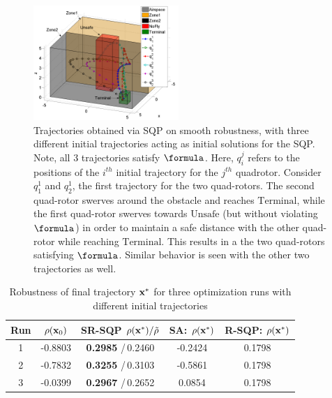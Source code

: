 

\begin{figure}[t]
\centering
\includegraphics[width=0.49\textwidth]{figures/QuadTrajs_scissored}
\caption{Trajectories obtained via SQP on smooth robustness, with three different initial trajectories acting as initial solutions for the SQP. Note, all 3 trajectories satisfy $\formula$. Here, $q_{i}^j$ refers to the positions of the $i^{th}$ initial trajectory for the $j^{th}$ quadrotor. Consider $q_{1}^1$ and $q_{2}^1$, the first trajectory for the two quad-rotors. The second quad-rotor swerves around the obstacle and reaches $\text{Terminal}$, while the first quad-rotor swerves towards $\text{Unsafe}$ (but without violating $\formula$) in order to maintain a safe distance with the other quad-rotor while reaching $\text{Terminal}$. This results in a the two quad-rotors satisfying $\formula$. Similar behavior is seen with the other two trajectories as well.}
\label{fig:quad_ssqp}
\end{figure}


%
{\small
\begin{table}[htb]
\begin{center}
\caption{Robustness of final trajectory $\mathbf{x}^*$ for three optimization runs with different initial trajectories}
\label{tbl:opt_performance}
\begin{tabular} {|c|c|c|c|c|}
	\hline
	\textbf{Run} & $\rho(\mathbf{x}_0) $ &SR-SQP $\rho(\mathbf{x}^*) /\tilde{\rho}$ & SA: $\rho(\mathbf{x}^*)$ & R-SQP: $\rho(\mathbf{x}^*)$\\ \hline
	1 & -0.8803 & \textbf{0.2985} /\,0.2460 & -0.2424 & 0.1798 \\ \hline
	2 & -0.7832 & \textbf{0.3255} /\,0.3103 & -0.5861 & 0.1798 \\ \hline
	3 & -0.0399 & \textbf{0.2967} /\,0.2652 & 0.0854 & 0.1798 \\ \hline
\end{tabular}	
\end{center}
\end{table}
}

